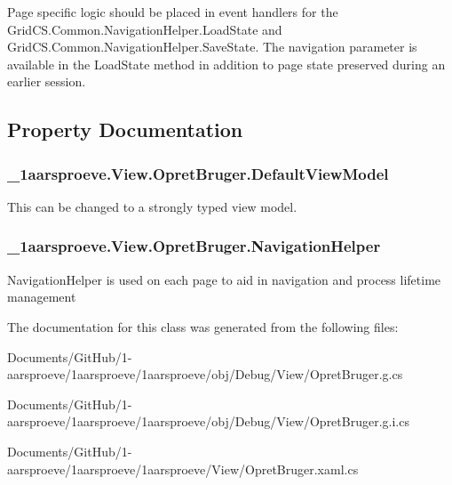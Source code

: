 Page specific logic should be placed in event handlers for the Grid\+C\+S.\+Common.\+Navigation\+Helper.\+Load\+State and Grid\+C\+S.\+Common.\+Navigation\+Helper.\+Save\+State. The navigation parameter is available in the Load\+State method in addition to page state preserved during an earlier session. 

\subsection{Property Documentation}
\hypertarget{class__1aarsproeve_1_1_view_1_1_opret_bruger_a597c247fbbf117d6d4ae8156433eb366}{}
\subsubsection[{Default\+View\+Model}]{ \+\_\+1aarsproeve.\+View.\+Opret\+Bruger.\+Default\+View\+Model\hspace{0.3cm}{\ttfamily [get]}}\label{class__1aarsproeve_1_1_view_1_1_opret_bruger_a597c247fbbf117d6d4ae8156433eb366}


This can be changed to a strongly typed view model. 

\hypertarget{class__1aarsproeve_1_1_view_1_1_opret_bruger_a3d67fd01a377d0a23130f57e9f785a46}{}
\subsubsection[{Navigation\+Helper}]{ \+\_\+1aarsproeve.\+View.\+Opret\+Bruger.\+Navigation\+Helper\hspace{0.3cm}{\ttfamily [get]}}\label{class__1aarsproeve_1_1_view_1_1_opret_bruger_a3d67fd01a377d0a23130f57e9f785a46}


Navigation\+Helper is used on each page to aid in navigation and process lifetime management 



The documentation for this class was generated from the following files\+:\begin{DoxyCompactItemize}
\item 
Documents/\+Git\+Hub/1-\/aarsproeve/1aarsproeve/1aarsproeve/obj/\+Debug/\+View/Opret\+Bruger.\+g.\+cs\item 
Documents/\+Git\+Hub/1-\/aarsproeve/1aarsproeve/1aarsproeve/obj/\+Debug/\+View/Opret\+Bruger.\+g.\+i.\+cs\item 
Documents/\+Git\+Hub/1-\/aarsproeve/1aarsproeve/1aarsproeve/\+View/Opret\+Bruger.\+xaml.\+cs\end{DoxyCompactItemize}
